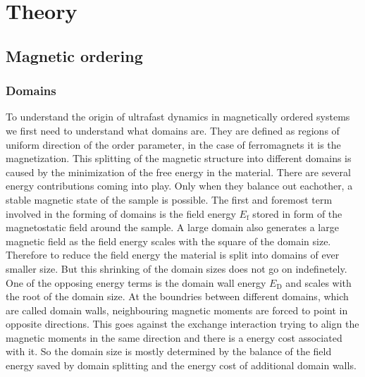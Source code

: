 \chapter{Theory}

\section{Magnetic ordering}
\subsection{Domains}
To understand the origin of ultrafast dynamics in magnetically ordered systems we first need to understand what domains are.
They are defined as regions of uniform direction of the order parameter, in the case of ferromagnets it is the magnetization.
This splitting of the magnetic structure into different domains is caused by the minimization of the free energy in the material.
There are several energy contributions coming into play.
Only when they balance out eachother, a stable magnetic state of the sample is possible.
The first and foremost term involved in the forming of domains is the field energy $E_{\text{f}}$ stored in form of the magnetostatic field around the sample.
A large domain also generates a large magnetic field as the field energy scales with the square of the domain size.
Therefore to reduce the field energy the material is split into domains of ever smaller size.
But this shrinking of the domain sizes does not go on indefinetely.
One of the opposing energy terms is the domain wall energy $E_{\text{D}}$ and scales with the root of the domain size.
At the boundries between different domains, which are called domain walls, neighbouring magnetic moments are forced to point in opposite directions.
This goes against the exchange interaction trying to align the magnetic moments in the same direction and there is a energy cost associated with it.
So the domain size is mostly determined by the balance of the field energy saved by domain splitting and the energy cost of additional domain walls.

